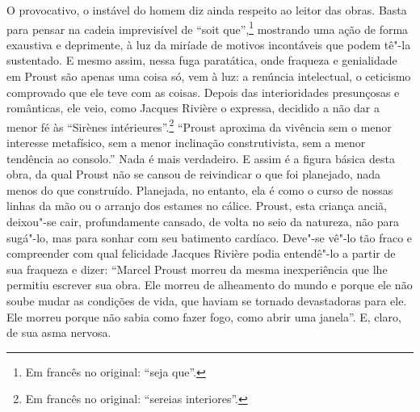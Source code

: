 O provocativo, o instável do homem diz ainda respeito ao leitor das
obras. Basta para pensar na cadeia imprevisível de ``soit
que'',\footnote{Em francês no original: ``seja que''. \versal{[N. T.]}} mostrando uma ação de forma
exaustiva e deprimente, à luz da miríade de motivos incontáveis que
podem tê"-la sustentado. E mesmo assim, nessa fuga paratática, onde
fraqueza e genialidade em Proust são apenas uma coisa só, vem à luz: a
renúncia intelectual, o ceticismo comprovado que ele teve com as coisas.
Depois das interioridades presunçosas e românticas, ele veio, como
Jacques Rivière o expressa, decidido a não dar a menor fé às ``Sirènes
intérieures''.\footnote{Em francês no original: ``sereias interiores''. \versal{[N. T.]}} ``Proust aproxima
da vivência sem o menor interesse metafísico, sem a menor inclinação
construtivista, sem a menor tendência ao consolo.'' Nada é mais
verdadeiro. E assim é a figura básica desta obra, da qual Proust não se
cansou de reivindicar o que foi planejado, nada menos do que construído.
Planejada, no entanto, ela é como o curso de nossas linhas da mão ou o
arranjo dos estames no cálice. Proust, esta criança anciã, deixou"-se
cair, profundamente cansado, de volta no seio da natureza, não para
sugá"-lo, mas para sonhar com seu batimento cardíaco. Deve"-se vê"-lo tão
fraco e compreender com qual felicidade Jacques Rivière podia entendê"-lo
a partir de sua fraqueza e dizer: ``Marcel Proust morreu da mesma
inexperiência que lhe permitiu escrever sua obra. Ele morreu de
alheamento do mundo e porque ele não soube mudar as condições de vida,
que haviam se tornado devastadoras para ele. Ele morreu porque não sabia
como fazer fogo, como abrir uma janela''. E, claro, de sua asma nervosa.

